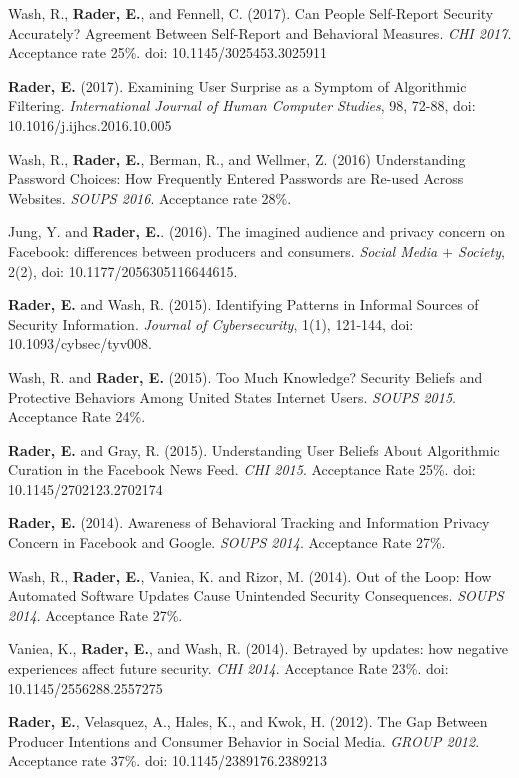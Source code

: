 \documentclass[9pt]{extarticle}
\begin{document}
Wash, R., \textbf{Rader, E.}, and Fennell, C. (2017). Can People Self-Report Security Accurately? Agreement Between Self-Report and Behavioral Measures. \emph{CHI 2017}. Acceptance rate 25\%. doi: 10.1145/3025453.3025911

\textbf{Rader, E.} (2017). Examining User Surprise as a Symptom of Algorithmic Filtering. \emph{International Journal of Human Computer Studies}, 98, 72-88, doi: 10.1016/j.ijhcs.2016.10.005

Wash, R., \textbf{Rader, E.}, Berman, R., and Wellmer, Z. (2016) Understanding Password Choices: How Frequently Entered Passwords are Re-used Across Websites. \emph{SOUPS 2016}. Acceptance rate 28\%.

Jung, Y. and \textbf{Rader, E.}. (2016). The imagined audience and privacy concern on Facebook: differences between producers and consumers. \emph{Social Media $+$ Society}, 2(2), doi: 10.1177/2056305116644615.

\textbf{Rader, E.} and Wash, R. (2015). Identifying Patterns in Informal Sources of Security Information. \emph{Journal of Cybersecurity}, 1(1), 121-144, doi: 10.1093/cybsec/tyv008.

Wash, R. and \textbf{Rader, E.} (2015). Too Much Knowledge? Security Beliefs and Protective Behaviors Among United States Internet Users. \emph{SOUPS 2015}. Acceptance Rate 24\%.

\textbf{Rader, E.} and Gray, R. (2015). Understanding User Beliefs About Algorithmic Curation in the Facebook News Feed. \emph{CHI 2015}. Acceptance Rate 25\%. doi: 10.1145/2702123.2702174

\textbf{Rader, E.} (2014). Awareness of Behavioral Tracking and Information Privacy Concern in Facebook and Google. \emph{SOUPS 2014}. Acceptance Rate 27\%.

Wash, R., \textbf{Rader, E.}, Vaniea, K. and Rizor, M. (2014). Out of the Loop: How Automated Software Updates Cause Unintended Security Consequences. \emph{SOUPS 2014}. Acceptance Rate 27\%.

Vaniea, K., \textbf{Rader, E.}, and Wash, R. (2014). Betrayed by updates: how negative experiences affect future security. \emph{CHI 2014}. Acceptance Rate 23\%. doi: 10.1145/2556288.2557275

\textbf{Rader, E.}, Velasquez, A., Hales, K., and Kwok, H. (2012). The Gap Between Producer Intentions and Consumer Behavior in Social Media. \emph{GROUP 2012}. Acceptance rate 37\%. doi: 10.1145/2389176.2389213
\end{document}
